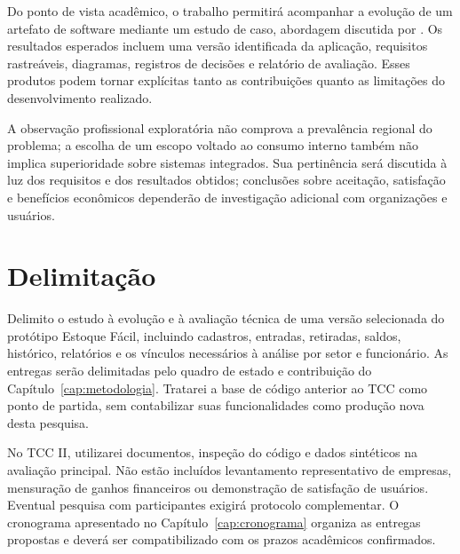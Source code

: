 Do ponto de vista acadêmico, o trabalho permitirá acompanhar a evolução de um artefato de software mediante um estudo de caso, abordagem discutida por . Os resultados esperados incluem uma versão identificada da aplicação, requisitos rastreáveis, diagramas, registros de decisões e relatório de avaliação. Esses produtos podem tornar explícitas tanto as contribuições quanto as limitações do desenvolvimento realizado.

A observação profissional exploratória não comprova a prevalência regional do problema; a escolha de um escopo voltado ao consumo interno também não implica superioridade sobre sistemas integrados. Sua pertinência será discutida à luz dos requisitos e dos resultados obtidos; conclusões sobre aceitação, satisfação e benefícios econômicos dependerão de investigação adicional com organizações e usuários.

\section{Delimitação}

Delimito o estudo à evolução e à avaliação técnica de uma versão selecionada do protótipo Estoque Fácil, incluindo cadastros, entradas, retiradas, saldos, histórico, relatórios e os vínculos necessários à análise por setor e funcionário. As entregas serão delimitadas pelo quadro de estado e contribuição do Capítulo~\ref{cap:metodologia}. Tratarei a base de código anterior ao TCC como ponto de partida, sem contabilizar suas funcionalidades como produção nova desta pesquisa.

No TCC II, utilizarei documentos, inspeção do código e dados sintéticos na avaliação principal. Não estão incluídos levantamento representativo de empresas, mensuração de ganhos financeiros ou demonstração de satisfação de usuários. Eventual pesquisa com participantes exigirá protocolo complementar. O cronograma apresentado no Capítulo~\ref{cap:cronograma} organiza as entregas propostas e deverá ser compatibilizado com os prazos acadêmicos confirmados.

